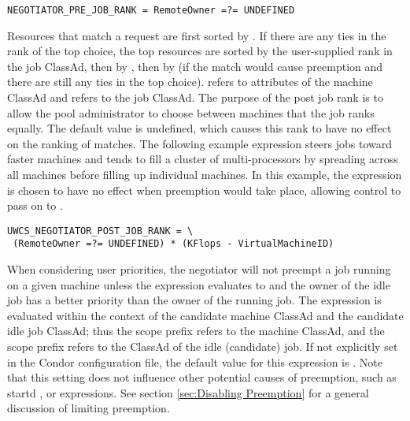 \begin{description}
\begin{verbatim}
NEGOTIATOR_PRE_JOB_RANK = RemoteOwner =?= UNDEFINED
\end{verbatim}

\item[\Macro{NEGOTIATOR\_POST\_JOB\_RANK}]
  \label{param:NegotiatorPostJobRank}
  Resources that match a request are first sorted by
  .  If there are any ties in the
  rank of the top choice, the top resources are sorted by the
  user-supplied rank in the job ClassAd, then by
  , then by
   (if the match would cause preemption and
  there are still any ties in the top choice).  \verb@MY@ refers to
  attributes of the machine ClassAd and \verb@TARGET@ refers to the
  job ClassAd.  The purpose of the post job rank is to allow the pool
  administrator to choose between machines that the job ranks equally.
  The default value is undefined, which causes this rank to have no
  effect on the ranking of matches.  The following example expression
  steers jobs toward faster machines and tends to fill a cluster of
  multi-processors by spreading across all machines before filling up
  individual machines.  In this example, the expression is chosen to
  have no effect when preemption would take place, allowing control to
  pass on to .

\begin{verbatim}
UWCS_NEGOTIATOR_POST_JOB_RANK = \
 (RemoteOwner =?= UNDEFINED) * (KFlops - VirtualMachineID)
\end{verbatim}


\item[\Macro{PREEMPTION\_REQUIREMENTS}]
  \label{param:PreemptionRequirements} When considering user priorities, the negotiator will not preempt
  a job running on a given machine unless the
   expression evaluates to  and the
  owner of the idle job has a better priority than the owner of the
  running job. 
  The  expression is evaluated within the
  context of the candidate machine ClassAd and the candidate idle job
  ClassAd; thus the \verb@MY@ scope prefix refers to the machine ClassAd,
  and the \verb@TARGET@ scope prefix refers to the ClassAd of the idle
  (candidate) job.  
  If not explicitly set in the Condor configuration file, the default value
  for this expression is \Expr{True}.
  Note that this setting does not
  influence other potential causes of preemption, such as startd
  \MacroNI{RANK}, or \MacroNI{PREEMPT} expressions.  See
  section \ref{sec:Disabling Preemption} for a general discussion of
  limiting preemption.


\end{description}
